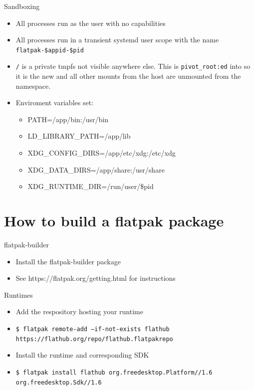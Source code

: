 \documentclass{lug}
\begin{document}
\begin{frame}{Sandboxing}
    \begin{itemize}
        \item All processes run as the user with no capabilities
        \item All processes run in a transient systemd user scope with the name \texttt{flatpak-\$appid-\$pid}
        \item \texttt{/} is a private tmpfs not visible anywhere else. This is \texttt{pivot\_root:ed} into so it is the new  and all other mounts from the host are unmounted from the namespace.
        \item Enviroment variables set:
        \begin{itemize}
            \item {PATH=/app/bin:/usr/bin}
            \item {LD\_LIBRARY\_PATH=/app/lib}
            \item {XDG\_CONFIG\_DIRS=/app/etc/xdg:/etc/xdg}
            \item {XDG\_DATA\_DIRS=/app/share:/usr/share}
            \item {XDG\_RUNTIME\_DIR=/run/user/\$pid}
        \end{itemize}    
    \end{itemize}
\end{frame}


\section{How to build a flatpak package}

\begin{frame}{flatpak-builder}
    \begin{itemize}
        \item Install the flatpak-builder package
        \item See https://flatpak.org/getting.html for instructions
    \end{itemize}
\end{frame}

\begin{frame}{Runtimes}
    \begin{itemize}
        \item Add the respository hosting your runtime 
        \item\texttt{\$\ flatpak remote-add --if-not-exists flathub https://flathub.org/repo/flathub.flatpakrepo}
        \item Install the runtime and corresponding SDK
        \item\texttt{\$\ flatpak install flathub org.freedesktop.Platform//1.6 org.freedesktop.Sdk//1.6}
    \end{itemize}
\end{frame}
\end{document}
